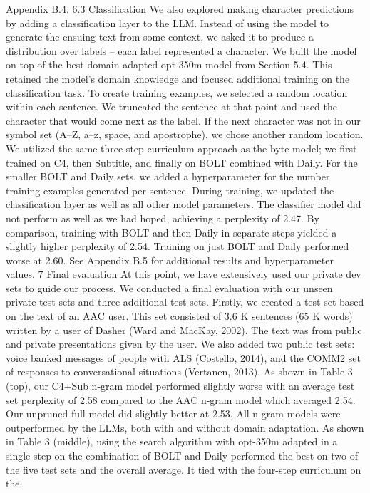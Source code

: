 Appendix B.4.
6.3 Classification
We also explored making character predictions by
adding a classification layer to the LLM. Instead of
using the model to generate the ensuing text from
some context, we asked it to produce a distribution
over labels – each label represented a character. We
built the model on top of the best domain-adapted
opt-350m model from Section 5.4. This retained
the model’s domain knowledge and focused additional training on the classification task.
To create training examples, we selected a random location within each sentence. We truncated
the sentence at that point and used the character
that would come next as the label. If the next character was not in our symbol set (A–Z, a–z, space,
and apostrophe), we chose another random location. We utilized the same three step curriculum
approach as the byte model; we first trained on C4,
then Subtitle, and finally on BOLT combined with
Daily. For the smaller BOLT and Daily sets, we
added a hyperparameter for the number training
examples generated per sentence. During training,
we updated the classification layer as well as all
other model parameters.
The classifier model did not perform as well as
we had hoped, achieving a perplexity of 2.47. By
comparison, training with BOLT and then Daily in
separate steps yielded a slightly higher perplexity
of 2.54. Training on just BOLT and Daily performed worse at 2.60. See Appendix B.5 for additional results and hyperparameter values.
7 Final evaluation
At this point, we have extensively used our private
dev sets to guide our process. We conducted a final evaluation with our unseen private test sets and
three additional test sets. Firstly, we created a test
set based on the text of an AAC user. This set consisted of 3.6 K sentences (65 K words) written by a
user of Dasher (Ward and MacKay, 2002). The text
was from public and private presentations given by
the user. We also added two public test sets: voice
banked messages of people with ALS (Costello,
2014), and the COMM2 set of responses to conversational situations (Vertanen, 2013).
As shown in Table 3 (top), our C4+Sub n-gram
model performed slightly worse with an average
test set perplexity of 2.58 compared to the AAC
n-gram model which averaged 2.54. Our unpruned
full model did slightly better at 2.53. All n-gram
models were outperformed by the LLMs, both with
and without domain adaptation.
As shown in Table 3 (middle), using the search
algorithm with opt-350m adapted in a single step
on the combination of BOLT and Daily performed
the best on two of the five test sets and the overall
average. It tied with the four-step curriculum on the
